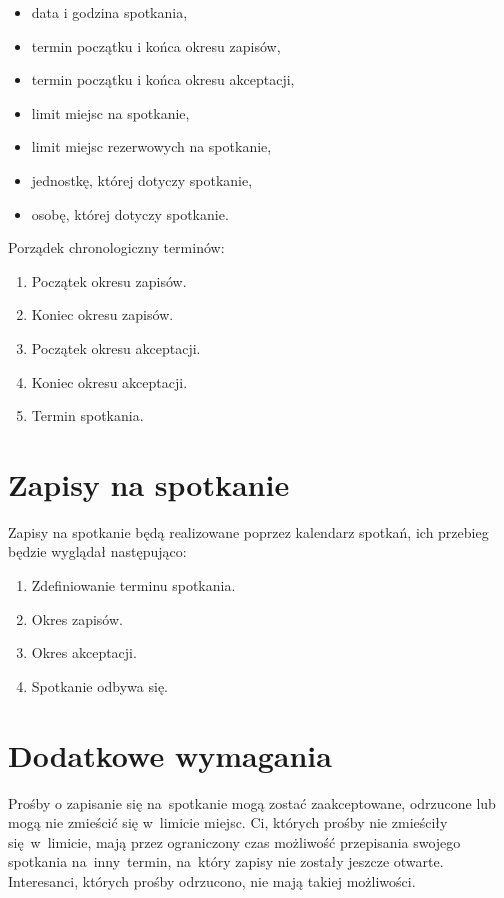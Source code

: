\documentclass[licencjacka]{pracamgr}
\begin{document}
\begin{itemize}
\setlength\itemsep{0,05em}
    \item data i godzina spotkania,
    \item termin początku i końca okresu zapisów,
    \item termin początku i końca okresu akceptacji,
    \item limit miejsc na spotkanie,
    \item limit miejsc rezerwowych na spotkanie,
    \item jednostkę, której dotyczy spotkanie,
    \item osobę, której dotyczy spotkanie.
\end{itemize}

Porządek chronologiczny terminów:

\begin{enumerate}
\setlength\itemsep{0,05em}
    \item Początek okresu zapisów.
    \item Koniec okresu zapisów.
    \item Początek okresu akceptacji.
    \item Koniec okresu akceptacji.
    \item Termin spotkania.
\end{enumerate}

\section{Zapisy na spotkanie}
Zapisy na spotkanie będą realizowane poprzez kalendarz spotkań, ich przebieg będzie wyglądał następująco:

\begin{enumerate}
    \item Zdefiniowanie terminu spotkania.
    \item Okres zapisów.
    \item Okres akceptacji.
    \item Spotkanie odbywa się.
\end{enumerate}

\section{Dodatkowe wymagania}
Prośby o zapisanie się na~spotkanie mogą zostać zaakceptowane, odrzucone lub mogą nie zmieścić się w~limicie miejsc. Ci, których prośby nie zmieściły się~w~limicie, mają przez ograniczony czas możliwość przepisania swojego spotkania na~inny~termin, na~który zapisy nie zostały jeszcze otwarte. Interesanci, których prośby odrzucono, nie mają takiej możliwości.
\end{document}
